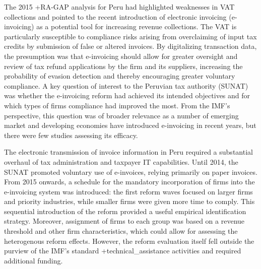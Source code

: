 \documentclass[
]{book}
\begin{document}
The 2015 +RA-GAP\textbar{} analysis for Peru had highlighted weaknesses in VAT collections and pointed to the recent introduction of electronic invoicing (e-invoicing) as a potential tool for increasing revenue collections. The VAT is particularly susceptible to compliance risks arising from overclaiming of input tax credits by submission of false or altered invoices. By digitalizing transaction data, the presumption was that e-invoicing should allow for greater oversight and review of tax refund applications by the firm and its suppliers, increasing the probability of evasion detection and thereby encouraging greater voluntary compliance. A key question of interest to the Peruvian tax authority (SUNAT) was whether the e-invoicing reform had achieved its intended objectives and for which types of firms compliance had improved the most. From the IMF's perspective, this question was of broader relevance as a number of emerging market and developing economies have introduced e-invoicing in recent years, but there were few studies assessing its efficacy.

The electronic transmission of invoice information in Peru required a substantial overhaul of tax administration and taxpayer IT capabilities. Until 2014, the SUNAT promoted voluntary use of e-invoices, relying primarily on paper invoices. From 2015 onwards, a schedule for the mandatory incorporation of firms into the e-invoicing system was introduced: the first reform waves focused on larger firms and priority industries, while smaller firms were given more time to comply. This sequential introduction of the reform provided a useful empirical identification strategy. Moreover, assignment of firms to each group was based on a revenue threshold and other firm characteristics, which could allow for assessing the heterogenous reform effects. However, the reform evaluation itself fell outside the purview of the IMF's standard +technical\_assistance\textbar{} activities and required additional funding.
\end{document}
